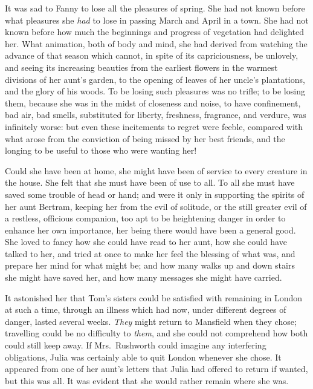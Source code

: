 It was sad to Fanny to lose all the pleasures of spring.
She had not known before what pleasures she \emph{had} to lose
in passing March and April in a town.  She had not known
before how much the beginnings and progress of vegetation
had delighted her.  What animation, both of body and mind,
she had derived from watching the advance of that season
which cannot, in spite of its capriciousness, be unlovely,
and seeing its increasing beauties from the earliest
flowers in the warmest divisions of her aunt's garden,
to the opening of leaves of her uncle's plantations,
and the glory of his woods.  To be losing such pleasures
was no trifle; to be losing them, because she was in
the midst of closeness and noise, to have confinement,
bad air, bad smells, substituted for liberty,
freshness, fragrance, and verdure, was infinitely worse:
but even these incitements to regret were feeble,
compared with what arose from the conviction of being
missed by her best friends, and the longing to be useful
to those who were wanting her!

Could she have been at home, she might have been of service
to every creature in the house.  She felt that she must
have been of use to all.  To all she must have saved some
trouble of head or hand; and were it only in supporting
the spirits of her aunt Bertram, keeping her from the evil
of solitude, or the still greater evil of a restless,
officious companion, too apt to be heightening danger
in order to enhance her own importance, her being there
would have been a general good.  She loved to fancy how she
could have read to her aunt, how she could have talked
to her, and tried at once to make her feel the blessing
of what was, and prepare her mind for what might be;
and how many walks up and down stairs she might have
saved her, and how many messages she might have carried.

It astonished her that Tom's sisters could be satisfied
with remaining in London at such a time, through an
illness which had now, under different degrees of danger,
lasted several weeks.  \emph{They} might return to Mansfield
when they chose; travelling could be no difficulty to \emph{them},
and she could not comprehend how both could still keep away.
If Mrs.\ Rushworth could imagine any interfering obligations,
Julia was certainly able to quit London whenever she chose.
It appeared from one of her aunt's letters that Julia
had offered to return if wanted, but this was all.
It was evident that she would rather remain where she was.

